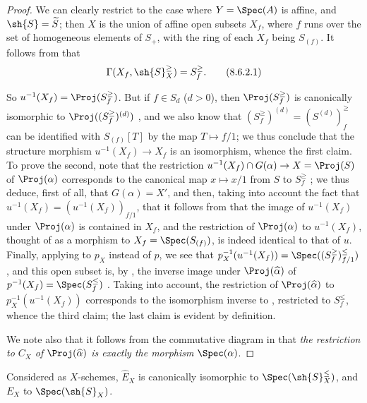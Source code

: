 \begin{proof}
We can clearly restrict to the case where $Y=\Spec(A)$ is affine, and $\sh{S}=\widetilde{S}$;
then $X$ is the union of affine open subsets $X_f$, where $f$ runs over the set of homogeneous elements of $S_+$, with the ring of each $X_f$ being $S_{(f)}$.
It follows from  that
\[
\label{II.8.6.2.1}
  \Gamma(X_f, \sh{S}_X^\geq) = S_f^\geq.
\tag{8.6.2.1}
\]

So $u^{-1}(X_f)=\Proj(S_f^\geq)$.
But if $f\in S_d$ ($d>0$), then $\Proj(S_f^\geq)$ is canonically isomorphic to $\Proj((S_f^\geq)^{(d)})$ , and we also know that $(S_f^\geq)^{(d)}=(S^{(d)})_f^\geq$ can be identified with $S_{(f)}[T]$  by the map $T\mapsto f/1$;
we thus conclude  that the structure morphism $u^{-1}(X_f)\to X_f$ is an isomorphism, whence the first claim.
To prove the second, note that the restriction $u^{-1}(X_f)\cap G(\alpha)\to X=\Proj(S)$ of $\Proj(\alpha)$ corresponds to the canonical map $x\mapsto x/1$ from $S$ to $S_f^\geq$ ;
we thus deduce, first of all, that $G(\alpha)=X'$, and then, taking into account the fact that $u^{-1}(X_f)=(u^{-1}(X_f))_{f/1}$, that it follows from  that the image of $u^{-1}(X_f)$ under $\Proj(\alpha)$ is contained in $X_f$, and the restriction of $\Proj(\alpha)$ to $u^{-1}(X_f)$, thought of as a morphism to $X_f=\Spec(S_{(f)})$, is indeed identical to that of $u$.
Finally, applying  to $p_X$ instead of $p$, we see that $p_X^{-1}(u^{-1}(X_f)) = \Spec((S_f^\geq)_{f/1}^\leq)$, and this open subset is, by , the inverse image under $\Proj(\widehat{\alpha})$ of $p^{-1}(X_f)=\Spec(S_f^\leq)$ .
Taking  into account, the restriction of $\Proj(\widehat{\alpha})$ to $p_X^{-1}(u^{-1}(X_f))$ corresponds to the isomorphism inverse to , restricted to $S_f^\leq$, whence the third claim;
the last claim is evident by definition.

We note also that it follows from the commutative diagram in  that \emph{the restriction to $C_X$ of $\Proj(\widehat{\alpha})$ is exactly the morphism $\Spec(\alpha)$}.
\end{proof}

\begin{corollary}[8.6.3]
\label{II.8.6.3}
Considered as $X$-schemes, $\widehat{E}_X$ is canonically isomorphic to $\Spec(\sh{S}_X^\leq)$, and $E_X$ to $\Spec(\sh{S}_X)$.
\end{corollary}

